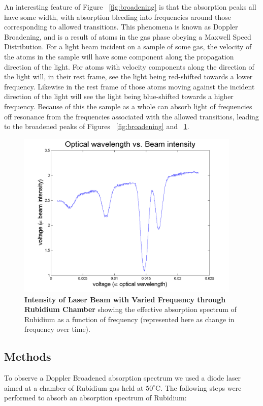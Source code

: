 \documentclass[paper=a4, fontsize=11pt]{scrartcl} %
\numberwithin{equation}{section}
\numberwithin{figure}{section}
\numberwithin{table}{section}
\begin{document}
An interesting feature of Figure ~\ref{fig:broadening} is that the
absorption peaks all have some width, with absorption bleeding into
frequencies around those corresponding to allowed transitions. This
phenomena is known as Doppler Broadening, and is a result of atoms in
the gas phase obeying a Maxwell Speed Distribution. For a light beam incident
on a sample of some gas, the velocity of the atoms in the sample will
have some component along the propagation direction of the light. For
atoms with velocity components along the direction of the light will,
in their rest frame, see the light being red-shifted towards a lower
frequency. Likewise in the rest frame of those atoms moving against
the incident direction of the light will see the light being
blue-shifted towards a higher frequency. Because of this the sample as
a whole can absorb light of frequencies off resonance from the
frequencies associated with the allowed transitions, leading to the
broadened peaks of Figures ~\ref{fig:broadening} and
~\ref{fig:absorb1}. 

\begin{figure}[h] \begin{center}
  \includegraphics[height=80mm]{absorb3.png}
  \caption{\textbf{Intensity of Laser Beam with Varied Frequency through Rubidium Chamber} showing the effective absorption spectrum of Rubidium as a function of frequency (represented here as change in frequency over time). }
  \label{fig:absorb1}
\end{center} \end{figure}

\subsection{Methods}
\label{sec:dop:meth}
To observe a Doppler Broadened absorption spectrum we used a diode
laser aimed at a chamber of Rubidium gas held at $50^\circ$C. The
following steps were performed to absorb an absorption spectrum of Rubidium:
\end{document}

